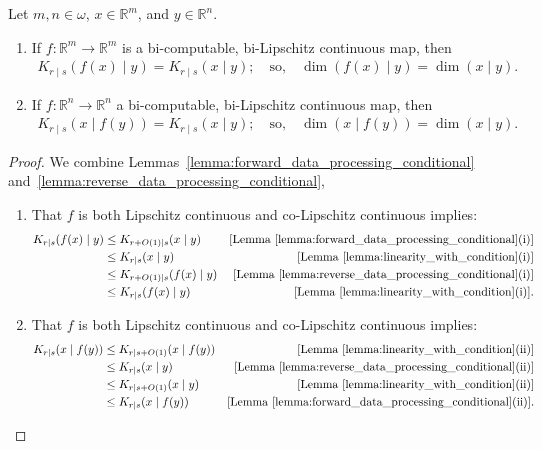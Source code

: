 \begin{theorem}
    \label{theorem:conditional_under_biLipschitz}
    Let $m, n \in \omega$, $x \in \mathbb{R}^m$, and $y \in \mathbb{R}^n$. 
    \begin{enumerate}[label = (\roman*)]
        \item If $f: \mathbb{R}^m \to \mathbb{R}^m$ is a bi-computable, bi-Lipschitz continuous map, then
            \begin{align*}
                K_{r \mid s}(f(x) \mid y) = K_{r \mid s}(x \mid y); \quad \text{so,} \quad \dim(f(x) \mid y) = \dim(x \mid y).
            \end{align*}
        \item If $f: \mathbb{R}^n \to \mathbb{R}^n$ a bi-computable, bi-Lipschitz continuous map, then 
            \begin{align*}
                K_{r \mid s}(x \mid f(y)) = K_{r \mid s}(x \mid y); \quad \text{so,} \quad \dim(x \mid f(y)) = \dim(x \mid y).
            \end{align*}
    \end{enumerate}
\end{theorem}
\begin{proof}
    We combine Lemmas~\ref{lemma:forward_data_processing_conditional} and~\ref{lemma:reverse_data_processing_conditional},
    \begin{enumerate}[label = (\roman*)]
        \item That $f$ is both Lipschitz continuous and co-Lipschitz continuous implies:
        \begin{align*}
            K_{r \mid s}(f(x) \mid y) &\leq K_{r + O(1) \mid s}(x \mid y) & [\text{Lemma~\ref{lemma:forward_data_processing_conditional}(i)}]\\
            &\leq K_{r \mid s}(x \mid y) & [\text{Lemma~\ref{lemma:linearity_with_condition}(i)}]\\
            &\leq K_{r + O(1)\mid s}(f(x) \mid y) & [\text{Lemma~\ref{lemma:reverse_data_processing_conditional}(i)}]\\
            &\leq K_{r \mid s}(f(x) \mid y) & [\text{Lemma~\ref{lemma:linearity_with_condition}(i)}].
        \end{align*}
        \item That $f$ is both Lipschitz continuous and co-Lipschitz continuous implies:
        \begin{align*}
            K_{r \mid s}(x \mid f(y)) &\leq K_{r \mid s + O(1)}(x \mid f(y)) & [\text{Lemma~\ref{lemma:linearity_with_condition}(ii)}]\\
            &\leq K_{r \mid s}(x \mid y) & [\text{Lemma~\ref{lemma:reverse_data_processing_conditional}(ii)}]\\
            &\leq K_{r \mid s + O(1)}(x \mid y) & [\text{Lemma~\ref{lemma:linearity_with_condition}(ii)}]\\
            &\leq K_{r \mid s}(x \mid f(y)) & [\text{Lemma~\ref{lemma:forward_data_processing_conditional}(ii)}].
        \end{align*}
    \end{enumerate}
\end{proof}

